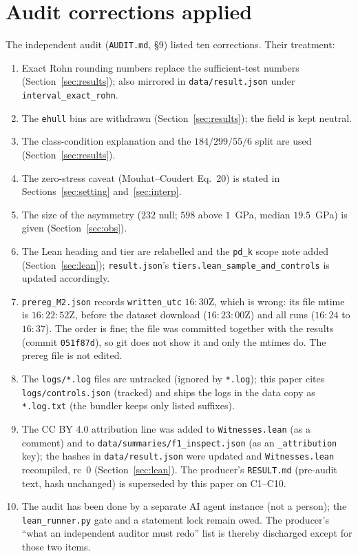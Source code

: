 \documentclass[10pt]{article}
\newcommand{\lean}[1]{\texttt{#1}}
\begin{document}
\section{Audit corrections applied}\label{sec:corr}
The independent audit (\texttt{AUDIT.md}, \S9) listed ten corrections. Their treatment:
\begin{enumerate}\itemsep=1pt
\item[C1] Exact Rohn rounding numbers replace the sufficient-test numbers (Section~\ref{sec:results}); also mirrored in \texttt{data/result.json} under \texttt{interval\_exact\_rohn}.
\item[C2] The \texttt{ehull} bins are withdrawn (Section~\ref{sec:results}); the field is kept neutral.
\item[C3] The class-condition explanation and the $184/299/55/6$ split are used (Section~\ref{sec:results}).
\item[C4] The zero-stress caveat (Mouhat--Coudert Eq.~20) is stated in Sections~\ref{sec:setting} and~\ref{sec:interp}.
\item[C5] The size of the asymmetry ($232$ null; $598$ above $1$~GPa, median $19.5$~GPa) is given (Section~\ref{sec:obs}).
\item[C6] The Lean heading and tier are relabelled and the \lean{pd\_k} scope note added (Section~\ref{sec:lean}); \texttt{result.json}'s \texttt{tiers.lean\_sample\_and\_controls} is updated accordingly.
\item[C7] \texttt{prereg\_M2.json} records \texttt{written\_utc} $16{:}30$Z, which is wrong: its file mtime is $16{:}22{:}52$Z, before the dataset download ($16{:}23{:}00$Z) and all runs ($16{:}24$ to $16{:}37$). The order is fine; the file was committed together with the results (commit \texttt{051f87d}), so git does not show it and only the mtimes do. The prereg file is not edited.
\item[C8] The \texttt{logs/*.log} files are untracked (ignored by \texttt{*.log}); this paper cites \texttt{logs/controls.json} (tracked) and ships the logs in the data copy as \texttt{*.log.txt} (the bundler keeps only listed suffixes).
\item[C9] The CC BY 4.0 attribution line was added to \texttt{Witnesses.lean} (as a comment) and to \texttt{data/summaries/f1\_inspect.json} (as an \texttt{\_attribution} key); the hashes in \texttt{data/result.json} were updated and \texttt{Witnesses.lean} recompiled, rc~$0$ (Section~\ref{sec:lean}). The producer's \texttt{RESULT.md} (pre-audit text, hash unchanged) is superseded by this paper on C1--C10.
\item[C10] The audit has been done by a separate AI agent instance (not a person); the \texttt{lean\_runner.py} gate and a statement lock remain owed. The producer's ``what an independent auditor must redo'' list is thereby discharged except for those two items.
\end{enumerate}
\end{document}

